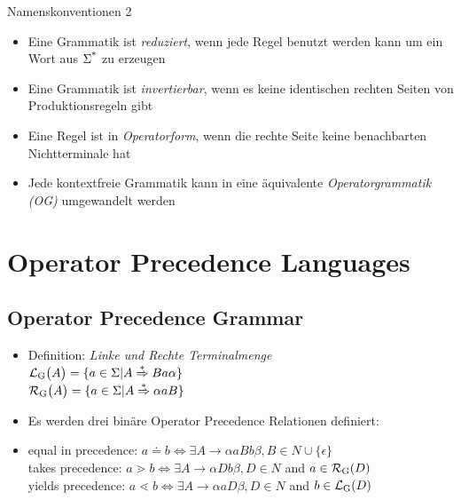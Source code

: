 \documentclass[
10pt,
pantone315, 	%
]{beamer}
\begin{document}
\begin{frame}[t]{Namenskonventionen 2}
	\begin{itemize}[<+->]
			\item
		Eine Grammatik ist \textit{reduziert}, wenn jede Regel benutzt werden kann um ein Wort aus $\Sigma \textsuperscript{*}$ zu erzeugen
		\item
		Eine Grammatik ist \textit{invertierbar}, wenn es keine identischen rechten Seiten von Produktionsregeln gibt
		\item
		Eine Regel ist in \textit{Operatorform}, wenn die rechte Seite keine benachbarten Nichtterminale hat
		\item 
		Jede kontextfreie Grammatik kann in eine äquivalente \textit{Operatorgrammatik (OG)} umgewandelt werden
		
		
	\end{itemize}
\end{frame}

\section{Operator Precedence Languages}
\subsection{Operator Precedence Grammar}
\begin{frame}[t]{\subsecname}
	\begin{itemize}[<+->]
		\item
		Definition: \textit{Linke und Rechte Terminalmenge}\\
		$\mathcal{L} \textsubscript{G} \big( A \big) = \{ a \in \Sigma | 
		A \overset{*}{\Rightarrow}Ba \alpha \} $\\
		$\mathcal{R} \textsubscript{G} \big( A \big) = \{ a \in \Sigma | 
		A \overset{*}{\Rightarrow} \alpha aB \}$
		\item
		Es werden drei binäre Operator Precedence Relationen definiert:
		\item
		equal in precedence: $ a \doteq b \Leftrightarrow \exists A \rightarrow \alpha aBb \beta , 
		B \in N \cup \{ \epsilon \}$ \\
		takes precedence: $ a \gtrdot b \Leftrightarrow \exists A \rightarrow \alpha Db \beta , D \in N $ and $ a \in
		\mathcal{R}\textsubscript{G}(D)$ \\
		yields precedence: $ a \lessdot b \Leftrightarrow \exists A \rightarrow \alpha aD \beta , D \in N $ and $ b \in
		\mathcal{L}\textsubscript{G}(D)$
		
	\end{itemize}
\end{frame}
\end{document}
